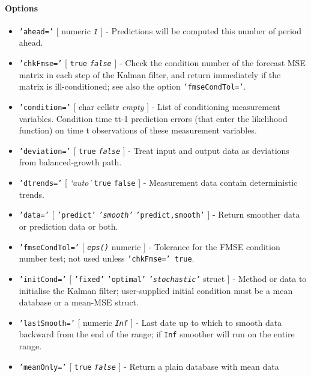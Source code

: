 \paragraph{Options}

\begin{itemize}
\item
  \texttt{'ahead='} {[} numeric \textbar{} \emph{\texttt{1}} {]} -
  Predictions will be computed this number of period ahead.
\item
  \texttt{'chkFmse='} {[} \texttt{true} \textbar{} \emph{\texttt{false}}
  {]} - Check the condition number of the forecast MSE matrix in each
  step of the Kalman filter, and return immediately if the matrix is
  ill-conditioned; see also the option \texttt{'fmseCondTol='}.
\item
  \texttt{'condition='} {[} char \textbar{} cellstr \textbar{}
  \emph{empty} {]} - List of conditioning measurement variables.
  Condition time t\textbar{}t-1 prediction errors (that enter the
  likelihood function) on time t observations of these measurement
  variables.
\item
  \texttt{'deviation='} {[} \texttt{true} \textbar{}
  \emph{\texttt{false}} {]} - Treat input and output data as deviations
  from balanced-growth path.
\item
  \texttt{'dtrends='} {[} \emph{`auto'} \textbar{} \texttt{true}
  \textbar{} \texttt{false} {]} - Measurement data contain deterministic
  trends.
\item
  \texttt{'data='} {[} \texttt{'predict'} \textbar{}
  \emph{\texttt{'smooth'}} \textbar{} \texttt{'predict,smooth'} {]} -
  Return smoother data or prediction data or both.
\item
  \texttt{'fmseCondTol='} {[} \emph{\texttt{eps()}} \textbar{} numeric
  {]} - Tolerance for the FMSE condition number test; not used unless
  \texttt{'chkFmse=' true}.
\item
  \texttt{'initCond='} {[} \texttt{'fixed'} \textbar{}
  \texttt{'optimal'} \textbar{} \emph{\texttt{'stochastic'}} \textbar{}
  struct {]} - Method or data to initialise the Kalman filter;
  user-supplied initial condition must be a mean database or a mean-MSE
  struct.
\item
  \texttt{'lastSmooth='} {[} numeric \textbar{} \emph{\texttt{Inf}} {]}
  - Last date up to which to smooth data backward from the end of the
  range; if \texttt{Inf} smoother will run on the entire range.
\item
  \texttt{'meanOnly='} {[} \texttt{true} \textbar{}
  \emph{\texttt{false}} {]} - Return a plain database with mean data

\end{itemize}
